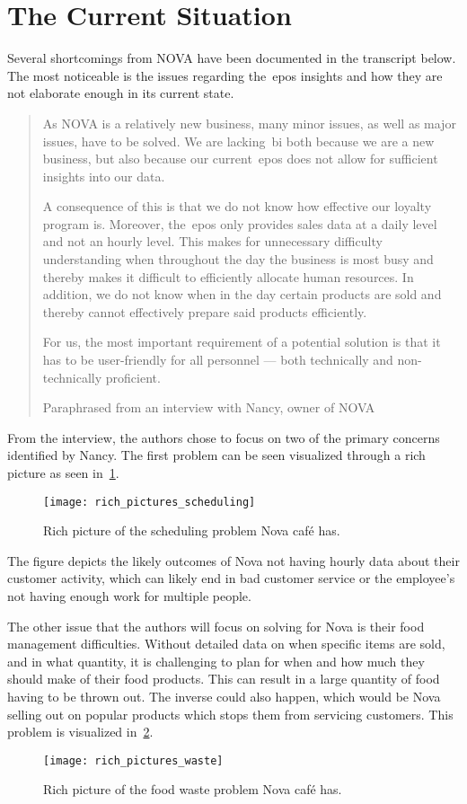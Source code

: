 \section{The Current Situation}\label{sec:the-current-situation}

Several shortcomings from NOVA have been documented in the transcript below.
The most noticeable is the issues regarding the~\acrfull{epos} insights and how they are not elaborate enough in its
current state.

\blockquote[Paraphrased from an interview with Nancy, owner of NOVA]{As NOVA is a relatively new business, many minor
issues, as well as major issues, have to be solved.
We are lacking~\acrshort{bi} both because we are a new business, but also because our current~\acrshort{epos} does not
allow for sufficient insights into our data.

A consequence of this is that we do not know how effective our loyalty program is.
Moreover, the~\acrshort{epos} only provides sales data at a daily level and not an hourly level.
This makes for unnecessary difficulty understanding when throughout the day the business is most busy and thereby makes
it difficult to efficiently allocate human resources.
In addition, we do not know when in the day certain products are sold and thereby cannot effectively prepare said
products efficiently.

For us, the most important requirement of a potential solution is that it has to be user-friendly for all personnel —
both technically and non-technically proficient.}

From the interview, the authors chose to focus on two of the primary concerns identified by Nancy.
The first problem can be seen visualized through a rich picture as seen in~\ref{fig:pda-scheduling-problem}.
\begin{figure}[th]
    \centering
    \texttt{[image: rich\_pictures\_scheduling]}
    \caption{Rich picture of the scheduling problem Nova café has.}\label{fig:pda-scheduling-problem}
\end{figure}
The figure depicts the likely outcomes of Nova not having hourly data about their customer activity,
which can likely end in bad customer service or the employee's not having enough work for multiple people.

The other issue that the authors will focus on solving for Nova is their food management difficulties.
Without detailed data on when specific items are sold, and in what quantity, it is challenging to plan
for when and how much they should make of their food products.
This can result in a large quantity of food having to be thrown out.
The inverse could also happen, which would be Nova selling out on popular products which stops them
from servicing customers.
This problem is visualized in~\ref{fig:pda-waste-problem}.

\begin{figure}[!h]
    \centering
    \texttt{[image: rich\_pictures\_waste]}
    \caption{Rich picture of the food waste problem Nova café has.}\label{fig:pda-waste-problem}
\end{figure}
